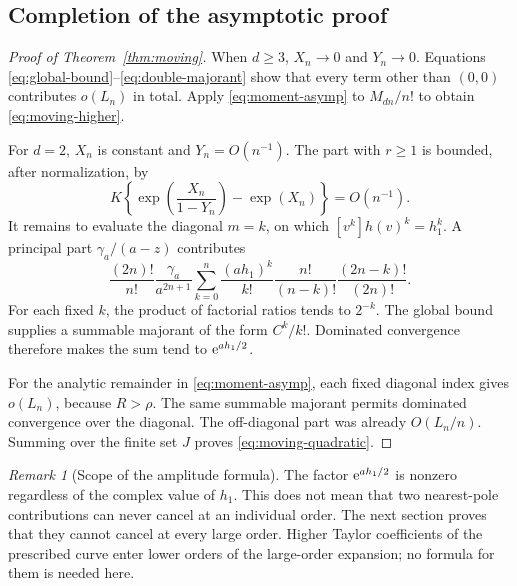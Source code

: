 \documentclass[11pt,a4paper]{article}
\numberwithin{equation}{section}
\theoremstyle{definition}\newtheorem{definition}[theorem]{Definition}
\theoremstyle{remark}\newtheorem{remark}[theorem]{Remark}
\theoremstyle{definition}
\begin{document}
\subsection{Completion of the asymptotic proof}
\begin{proof}[Proof of Theorem~\ref{thm:moving}]
When $d\ge3$, $X_n\to0$ and $Y_n\to0$. Equations
\eqref{eq:global-bound}--\eqref{eq:double-majorant} show that every term other
than $(0,0)$ contributes $o(L_n)$ in total. Apply
\eqref{eq:moment-asymp} to $M_{dn}/n!$ to obtain
\eqref{eq:moving-higher}.

For $d=2$, $X_n$ is constant and $Y_n=O(n^{-1})$. The part with $r\ge1$ is
bounded, after normalization, by
\[
 K\left\{\exp\!\left(\frac{X_n}{1-Y_n}\right)-\exp(X_n)\right\}
 =O(n^{-1}).
\]
It remains to evaluate the diagonal $m=k$, on which
$[v^k]h(v)^k=h_1^k$. A principal part $\gamma_a/(a-z)$ contributes
\[
 \frac{(2n)!}{n!}\frac{\gamma_a}{a^{2n+1}}
 \sum_{k=0}^n\frac{(a h_1)^k}{k!}
     \frac{n!}{(n-k)!}\frac{(2n-k)!}{(2n)!}.
\]
For each fixed $k$, the product of factorial ratios tends to $2^{-k}$.
The global bound supplies a summable majorant of the form $C^k/k!$.
Dominated convergence therefore makes the sum tend to $\mathrm e^{a h_1/2}$.

For the analytic remainder in \eqref{eq:moment-asymp}, each fixed diagonal
index gives $o(L_n)$, because $R>\rho$. The same summable majorant permits
dominated convergence over the diagonal. The off-diagonal part was already
$O(L_n/n)$. Summing over the finite set $J$ proves
\eqref{eq:moving-quadratic}.
\end{proof}

\begin{remark}[Scope of the amplitude formula]
The factor $\mathrm e^{a h_1/2}$ is nonzero regardless of the complex value of $h_1$.
This does not mean that two nearest-pole contributions can never cancel at an
individual order. The next section proves that they cannot cancel at every
large order. Higher Taylor coefficients of the prescribed curve enter lower
orders of the large-order expansion; no formula for them is needed here.
\end{remark}
\end{document}
